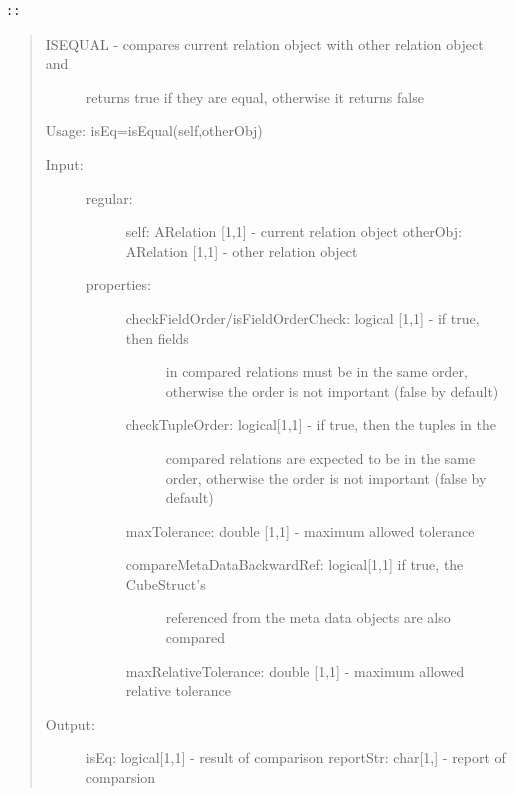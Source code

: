 \documentclass[letterpaper,10pt,english]{sphinxmanual}
\begin{document}
\begin{Verbatim}[commandchars=\\\{\}]
::
\end{Verbatim}
\begin{quote}
\begin{description}
\item[{ISEQUAL - compares current relation object with other relation object and}] \leavevmode
returns true if they are equal, otherwise it returns false

\end{description}

Usage: isEq=isEqual(self,otherObj)
\begin{description}
\item[{Input:}] \leavevmode\begin{description}
\item[{regular:}] \leavevmode
self: ARelation {[}1,1{]} - current relation object
otherObj: ARelation {[}1,1{]} - other relation object

\item[{properties:}] \leavevmode\begin{description}
\item[{checkFieldOrder/isFieldOrderCheck: logical {[}1,1{]} - if true, then fields}] \leavevmode
in compared relations must be in the same order, otherwise the
order is not  important (false by default)

\item[{checkTupleOrder: logical{[}1,1{]} -  if true, then the tuples in the}] \leavevmode
compared relations are expected to be in the same order,
otherwise the order is not important (false by default)

\end{description}

maxTolerance: double {[}1,1{]} - maximum allowed tolerance
\begin{description}
\item[{compareMetaDataBackwardRef: logical{[}1,1{]} if true, the CubeStruct's}] \leavevmode
referenced from the meta data objects are also compared

\end{description}

maxRelativeTolerance: double {[}1,1{]} - maximum allowed
relative tolerance

\end{description}

\item[{Output:}] \leavevmode
isEq: logical{[}1,1{]} - result of comparison
reportStr: char{[}1,{]} - report of comparsion

\end{description}
\end{quote}
\end{document}
